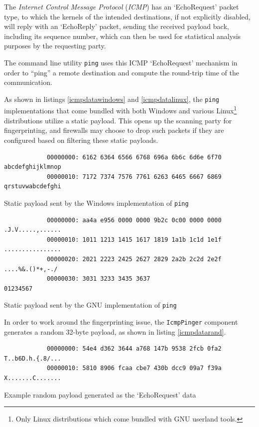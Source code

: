 \documentclass[a4paper,12pt]{article}
\begin{document}
	The \textit{Internet Control Message Protocol} (\textit{ICMP}) has an `EchoRequest' packet type, to which the kernels of the intended destinations, if not explicitly disabled, will reply with an `EchoReply' packet, sending the received payload back, including its sequence number, which can then be used for statistical analysis purposes by the requesting party.

	The command line utility \texttt{ping} uses this ICMP `EchoRequest' mechanism in order to ``ping'' a remote destination and compute the round-trip time of the communication.
	
	As shown in listings \ref{icmpdatawindows} and \ref{icmpdatalinux}, the \texttt{ping} implementations that come bundled with both Windows and various Linux\footnote{Only Linux distributions which come bundled with GNU userland tools.} distributions utilize a static payload. This opens up the scanning party for fingerprinting, and firewalls may choose to drop such packets if they are configured based on filtering these static payloads.
	
	\begin{listing}[H]
		\begin{verbatim}
			00000000: 6162 6364 6566 6768 696a 6b6c 6d6e 6f70  abcdefghijklmnop
			00000010: 7172 7374 7576 7761 6263 6465 6667 6869  qrstuvwabcdefghi
		\end{verbatim}
		\caption{Static payload sent by the Windows implementation of \texttt{ping}}
		\label{icmpdatawindows}
	\end{listing}
	
	\begin{listing}[H]
		\begin{verbatim}
			00000000: aa4a e956 0000 0000 9b2c 0c00 0000 0000  .J.V.....,......
			00000010: 1011 1213 1415 1617 1819 1a1b 1c1d 1e1f  ................
			00000020: 2021 2223 2425 2627 2829 2a2b 2c2d 2e2f   ....%&.()*+,-./
			00000030: 3031 3233 3435 3637                      01234567
		\end{verbatim}
		\caption{Static payload sent by the GNU implementation of \texttt{ping}}
		\label{icmpdatalinux}
	\end{listing}
	
	In order to work around the fingerprinting issue, the \texttt{IcmpPinger} component generates a random 32-byte payload, as shown in listing \ref{icmpdatarand}.
	
	\begin{listing}[H]
		\begin{verbatim}
			00000000: 54e4 d362 3644 a768 147b 9538 2fcb 0fa2  T..b6D.h.{.8/...
			00000010: 5810 8906 fcaa cbe7 430b dcc9 09a7 f39a  X.......C.......
		\end{verbatim}
		\caption{Example random payload generated as the `EchoRequest' data}
		\label{icmpdatarand}
	\end{listing}
\end{document}
